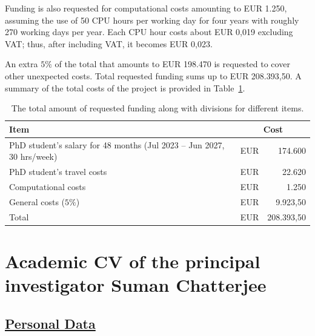 \documentclass[a4paper,11pt]{article}
\begin{document}
Funding is also requested for computational costs amounting to EUR 1.250, assuming the use of 50 CPU hours per working day for four years with roughly 270 working days per year. Each CPU hour costs about EUR 0,019 excluding VAT; thus, after including VAT, it becomes EUR 0,023. 

An extra $5\%$ of the total that amounts to EUR 198.470 is requested to cover other unexpected costs.  
Total requested funding sums up to EUR 208.393,50. 
A summary of the total costs of the project is provided in Table~\ref{Tab:Total_cost}.
\begin{table}
\caption{The total amount of requested funding along with divisions for different items.}
\begin{center}
{\renewcommand{\arraystretch}{1.3}
\begin{tabular}{m{6 cm}| r r}
Item & \multicolumn{2}{c}{ Cost } \\
\hline 
PhD student's salary for 48 months (Jul 2023 -- Jun 2027, 30 hrs/week) & EUR & 174.600  \\
PhD student's travel costs & EUR & 22.620 \\
Computational costs & EUR & 1.250 \\
\hline
General costs ($5\%$) & EUR & 9.923,50  \\
\hline
Total & EUR & 208.393,50
\end{tabular}
}
\end{center}
\label{Tab:Total_cost}
\end{table}

\newpage
\clearpage

\section{Academic CV of the principal investigator Suman Chatterjee}

\subsection*{\underline{Personal Data}}
\end{document}

